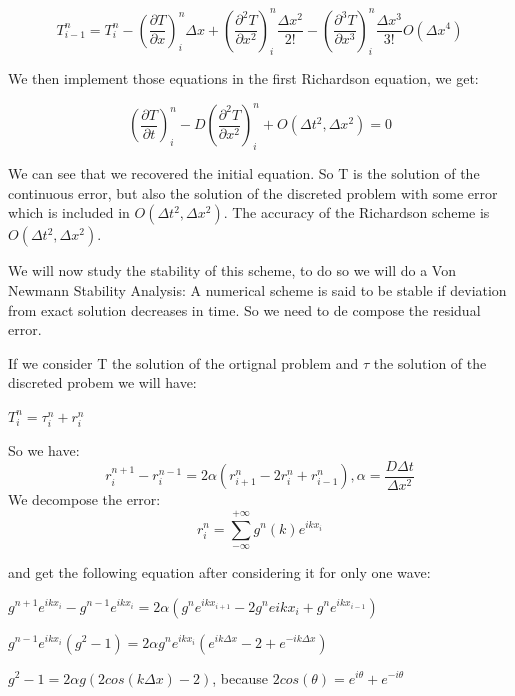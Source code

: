 \documentclass [10 pt, a4 paper]{article}
\begin{document}
\begin{equation}
    T_{i-1}^{n} = T_{i}^{n} - (\frac{\partial T}{\partial x})_{i}^{n} \Delta x + (\frac{\partial^{2} T}{\partial x^{2}})_{i}^{n} \frac{\Delta x^{2}}{2!} - (\frac{\partial^{3} T}{\partial x^{3}})_{i}^{n} \frac{\Delta x^{3}}{3!} O(\Delta x^{4})         
\end{equation}

We then implement those equations in the first Richardson equation, we get:

\begin{equation}
    (\frac{\partial T}{\partial t})_{i}^{n} - D (\frac{\partial^{2} T}{\partial x^{2}})_{i}^{n} + O(\Delta t^{2}, \Delta x^{2}) = 0
\end{equation}

We can see that we recovered the initial equation. So T is the solution of the continuous error,
but also the solution of the discreted problem with some error which is included in $O(\Delta t^{2}, \Delta x^{2})$.
The accuracy of the Richardson scheme is $O(\Delta t^{2}, \Delta x^{2})$.

We will now study the stability of this scheme, to do so we will do a Von Newmann Stability Analysis:
A numerical scheme is said to be stable if deviation from exact solution decreases in time.
So we need to de compose the residual error.

If we consider T the solution of the ortignal problem and $\tau$ the solution of the discreted probem
we will have:

$T_{i}^{n} = \tau_{i}^{n} + r_{i}^{n}$

So we have:
\begin{equation}
    r_{i}^{n+1} - r_{i}^{n-1} = 2\alpha (r_{i+1}^{n} - 2 r_{i}^{n} + r_{i-1}^{n}), \alpha = \frac{D \Delta t}{\Delta x^{2}}
\end{equation}
We decompose the error: 
\begin{equation}
    r_{i}^{n} = \sum_{-\infty }^{+\infty } g^{n}(k) e^{ikx_{i}} 
\end{equation}

and get the following equation after considering it for only one wave:

$g^{n+1}e^{ikx_{i}} - g^{n-1}e^{ikx_{i}} = 2\alpha(g^{n}e^{ikx_{i+1}} -2 g^{n}e{ikx_{i} + g^{n}e^{ikx_{i-1}}})$

$g^{n-1}e^{ikx_{i}}(g^{2} - 1) = 2\alpha g^{n}e^{ikx_{i}}(e^{ik\Delta x} - 2 + e^{-ik\Delta x})$

$g^{2} - 1 = 2\alpha g (2cos(k \Delta x) -2)$, because $2cos(\theta) = e^{i\theta} + e^{-i\theta} $
\end{document}
